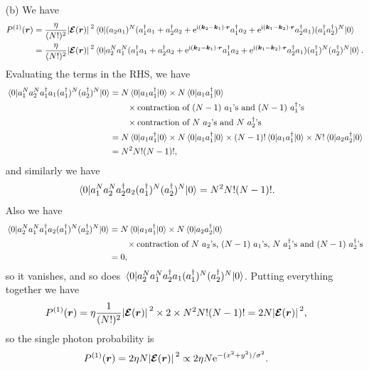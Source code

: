 \documentclass[hyperref, a4paper]{article}
\newcommand*{\ii}{\mathrm{i}}
\newcommand*{\ee}{\mathrm{e}}
\begin{document}
\begin{itemize}
\item[(b)] We have 
\[
    \begin{aligned}
        P^{(1)}(\vb*{r}) &= \frac{\eta}{(N!)^2} \abs*{\vb*{\mathcal{E}}(\vb*{r})}^2 \expval*{(a_2 a_1)^N (a_1^\dagger a_1 + a_2^\dagger a_2 + \ee^{\ii (\vb*{k}_2 - \vb*{k}_1) \cdot \vb*{r}} a_1^\dagger a_2 + \ee^{\ii (\vb*{k}_1 - \vb*{k}_2) \cdot \vb*{r}} a_2^\dagger a_1 ) (a_1^\dagger a_2^\dagger)^N}{0} \\
        &= \frac{\eta}{(N!)^2} \abs*{\vb*{\mathcal{E}}(\vb*{r})}^2 \expval*{a_2^N a_1^N (a_1^\dagger a_1 + a_2^\dagger a_2 + \ee^{\ii (\vb*{k}_2 - \vb*{k}_1) \cdot \vb*{r}} a_1^\dagger a_2 + \ee^{\ii (\vb*{k}_1 - \vb*{k}_2) \cdot \vb*{r}} a_2^\dagger a_1 ) (a_1^\dagger)^N (a_2^\dagger)^N}{0}.
    \end{aligned}
\] 
Evaluating the terms in the RHS, we have 
\[
    \begin{aligned}
        \expval*{a_1^N a_2^N a_1^\dagger a_1 (a_1^\dagger)^N (a_2^\dagger)^N}{0} 
        &= N \expval*{a_1 a_1^\dagger}{0} \times N \expval*{a_1 a_1^\dagger}{0} \\
        &\quad \quad \times \text{contraction of $(N-1)$ $a_1$'s and $(N-1)$ $a_1^\dagger$'s} \\
        &\quad \quad \times \text{contraction of $N$ $a_2$'s and $N$ $a_2^\dagger$'s} \\
        &= N \expval*{a_1 a_1^\dagger}{0} \times N \expval*{a_1 a_1^\dagger}{0} 
        \times (N-1)! \expval*{a_1 a_1^\dagger}{0} \times N! \expval*{a_2 a_2^\dagger}{0} \\
        &= N^2 N! (N-1)!,
    \end{aligned}
\]
and similarly we have 
\[
    \expval*{a_1^N a_2^N a_2^\dagger a_2 (a_1^\dagger)^N (a_2^\dagger)^N}{0} = N^2 N! (N-1)!.
\]
Also we have 
\[
    \begin{aligned}
        \expval*{a_2^N a_1^N a_1^\dagger a_2 (a_1^\dagger)^N (a_2^\dagger)^N}{0}
        &= N \expval*{a_1 a_1^\dagger}{0} \times N \expval*{a_2 a_2^\dagger}{0}  \\
        &\quad \quad \times \text{contraction of $N$ $a_2$'s, $(N-1)$ $a_1$'s, $N$ $a_1^\dagger$'s and $(N-1)$ $a^\dagger_2$'s} \\
        &= 0, 
    \end{aligned}
\]
so it vanishes, and so does $\expval*{a_2^N a_1^N a_2^\dagger a_1 (a_1^\dagger)^N (a_2^\dagger)^N}{0}$.
Putting everything together we have 
\[
    P^{(1)}(\vb*{r}) = \eta \frac{1}{(N!)^2} \abs*{\vb*{\mathcal{E}}(\vb*{r})}^2 \times 2 \times N^2 N! (N-1)! = 2 N \abs*{\vb*{\mathcal{E}}(\vb*{r})}^2,
\]
so the single photon probability is 
\begin{equation}
    P^{(1)}(\vb*{r}) = 2 \eta N \abs*{\vb*{\mathcal{E}}(\vb*{r})}^2 \propto 2 \eta N \ee^{- (x^2 + y^2) / \sigma^2}.
    \label{eq:prob-1-b-1}
\end{equation}


\end{itemize}
\end{document}
